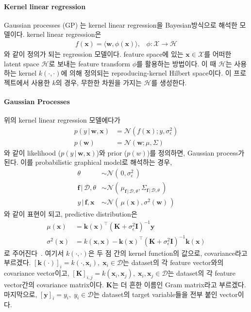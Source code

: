 \documentclass[ba]{imsart}
\newcommand{\vf}{\mathbf{f}}
\newcommand{\vk}{\mathbf{k}}
\newcommand{\vw}{\mathbf{w}}
\newcommand{\vx}{\mathbf{x}}
\newcommand{\vy}{\mathbf{y}}
\newcommand{\mI}{\mathbf{I}}
\newcommand{\mK}{\mathbf{K}}
\begin{document}
\paragraph{Kernel linear regression}
Gaussian processes (GP) 는 kernel linear regression을 Bayesian방식으로 해석한 모델이다.
kernel linear regression은 
\begin{align}
  f(\vx) = \langle \vw, \phi(\vx) \rangle, \;\;\; \phi : \mathcal{X} \rightarrow \mathcal{H}
\end{align}
와 같이 정의가 되는 regression 모델이다.
feature space에 있는 \(\vx \in \mathcal{X}\)를 어떠한 latent space \(\mathcal{H}\)로 보내는 feature transform \(\phi\)를 활용하는 방법이다.
이 때 \(\mathcal{H}\)는 사용하는 kernel \(k(\cdot, \cdot)\)에 의해 정의되는 reproducing-kernel Hilbert space이다.
이 프로젝트에서 사용한 \(k\)의 경우, 무한한 차원을 가지는 \(\mathcal{H}\)를 생성한다.

\paragraph{Gaussian Processes}
위의 kernel linear regression 모델에다가
\begin{align}
  p(y \,|\, \vw, \vx) &= \mathcal{N}(f(\vx); y, \sigma^2_{\mathcal{\epsilon}}) \\
  p(\vw)              &= \mathcal{N}(\vw; \mu, \Sigma)
\end{align}
와 같이 likelihood (\(p(y \,|\, \vw, \vx)\))와 prior (\(p(w)\))를 정의하면, Gaussian process가 된다.
이를 probabilistic graphical model로 해석하는 경우, 
\begin{align}
  \theta                        &\sim \mathcal{N}(\,0, \sigma^2_{\epsilon}\,) \\
  \vf \,|\, \mathcal{D}, \theta &\sim \mathcal{N}(\, \mu_{\vf \,|\, \mathcal{D}, \theta}, \Sigma_{\vf \,|\, \mathcal{D}, \theta}\,) \\
  y   \,|\, \vf, \vx            &\sim \mathcal{N}(\, \mu(\vx), \sigma^2(\vw)\,)
\end{align}
와 같이 표현이 되고, predictive distribution은
\begin{align}
 \mu(\vx)      &= {\vk(\vx)}^{\top } {(\mK + \sigma^2_{\epsilon} \mI)}^{-1} \vy \label{eq:mu} \\
 \sigma^2(\vx) &= k(\vx, \vx) - {\vk(\vx)}^{\top}{(\mK + \sigma^2_{\epsilon} \mI)}^{-1} {\vk(\vx)} \label{eq:sigma}
\end{align}
로 주어진다~\cite{rasmussen_gaussian_2006}.
여기서 \(k(\cdot, \cdot)\)은 두 점 간의 kernel function의 값으로, covariance라고 부르겠다.
\({[\vk(\cdot)]}_i = {k(\cdot, \vx_i)}, \; {\vx_i \in \mathcal{D}}\)는 dataset의 각 feature vector와의 covariance vector이고,
\({[\mK]}_{i,j} = {k(\vx_i, \vx_j)}, \; {\vx_i, \vx_j \in \mathcal{D}}\)는 dataset의 각 feature vector간의 covariance matrix이다.
\(\mK\)는 더 흔한 이름인 Gram matrix라고 부르겠다.
마지막으로, \({[\vy]}_{i} = y_i, \; y_i \in \mathcal{D} \)는 dataset의 target variable들을 전부 붙인 vector이다.
\end{document}
